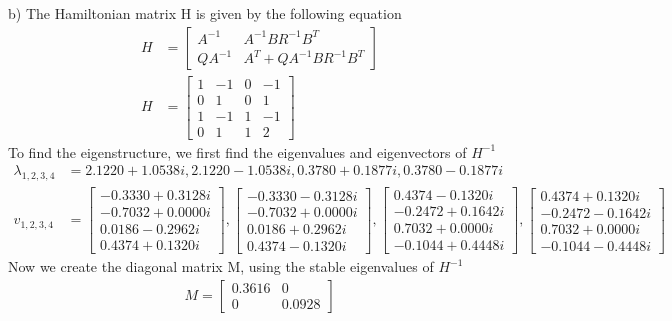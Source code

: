 \documentclass{article}
\begin{document}
  b) The Hamiltonian matrix H is given by the following equation
  \begin{align*}
	  H&=\begin{bmatrix}
		  A^{-1} & A^{-1}BR^{-1}B^T \\
		  QA^{-1} & A^T+QA^{-1}BR^{-1}B^T
	  \end{bmatrix} \\
	  H&=\begin{bmatrix}
		  1 & -1 & 0 & -1 \\
		  0 & 1 & 0 & 1 \\
		  1 & -1 & 1 & -1 \\
		  0 & 1 & 1 & 2
	  \end{bmatrix}
  \end{align*}
  To find the eigenstructure, we first find the eigenvalues and eigenvectors of $H^{-1}$
  \begin{align*}
	  \lambda_{1,2,3,4}&=2.1220+1.0538i,2.1220-1.0538i,0.3780+0.1877i,0.3780-0.1877i \\
	  v_{1,2,3,4}&=
	  \begin{bmatrix}
		  -0.3330 + 0.3128i \\
		  -0.7032 + 0.0000i \\
		   0.0186 - 0.2962i \\
		   0.4374 + 0.1320i
	  \end{bmatrix},
	  \begin{bmatrix}
		  -0.3330 - 0.3128i \\
		  -0.7032 + 0.0000i \\
		   0.0186 + 0.2962i \\
		   0.4374 - 0.1320i
	  \end{bmatrix},
	  \begin{bmatrix}
		   0.4374 - 0.1320i \\
		  -0.2472 + 0.1642i \\
		   0.7032 + 0.0000i \\
		  -0.1044 + 0.4448i
	  \end{bmatrix},
	  \begin{bmatrix}
		   0.4374 + 0.1320i \\
		  -0.2472 - 0.1642i \\
		   0.7032 + 0.0000i \\
		  -0.1044 - 0.4448i
	  \end{bmatrix}
  \end{align*}
  Now we create the diagonal matrix M, using the stable eigenvalues of $H^{-1}$
  \begin{align*}
	  M=
	  \begin{bmatrix}
		  0.3616 & 0 \\
		  0 & 0.0928
	  \end{bmatrix}
  \end{align*}
\end{document}

